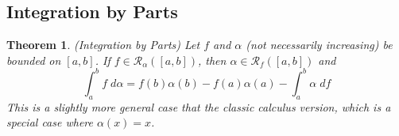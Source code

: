 \documentclass[12pt]{article}
\theoremstyle{plain}
\newtheorem{thm}{Theorem}[subsection]
\theoremstyle{definition}
\theoremstyle{remark}
\begin{document}
\subsection{Integration by Parts}

\begin{thm}
\label{thm.intbyparts}
\emph{(Integration by Parts)} 
Let $f$ and $\alpha$ (not necessarily increasing) be bounded on $[a,b]$. If $f\in\mathscr{R}_\alpha([a,b])$, then $\alpha\in\mathscr{R}_f([a,b])$ and 
\begin{equation}
    \label{intbyparts}
    \int^b_a f\;d\alpha = f(b) \alpha(b) - f(a)\alpha(a) - 
    \int^b_a \alpha \; df 
\end{equation}
This is a slightly more general case that the classic calculus version, which is a special case where $\alpha(x)=x$.
\end{thm}
\end{document}

